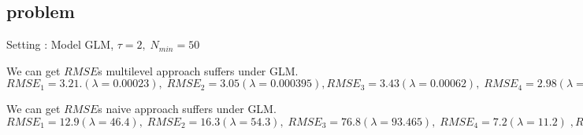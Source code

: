 \documentclass[
]{article}
\begin{document}
\hypertarget{problem}{%
\subsection{problem}\label{problem}}

Setting : Model GLM, \(\tau=2, \; N_{min}=50\)

We can get \(RMSE\)s multilevel approach suffers under GLM.
\(RMSE_1=3.21.(\lambda=0.00023),\; RMSE_2=3.05(\lambda=0.000395), RMSE_3=3.43(\lambda=0.00062), \;RMSE_4=2.98(\lambda=0.000508),\;RMSE_5=3.04(\lambda=0.000197)\)

We can get \(RMSE\)s naive approach suffers under GLM.
\(RMSE_1=12.9(\lambda=46.4),\;RMSE_2=16.3(\lambda=54.3),\;RMSE_3=76.8(\lambda=93.465),\;RMSE_4=7.2(\lambda=11.2)\;,RMSE_5=22.6(\lambda=394.54)\)
\end{document}
